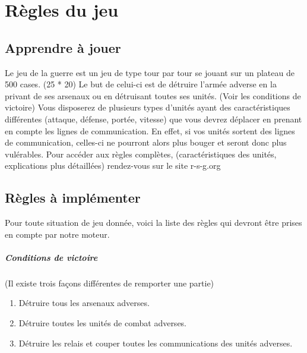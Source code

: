 \chapter{Règles du jeu}

		\section{Apprendre à jouer}
		
		Le jeu de la guerre est un jeu de type tour par tour se jouant sur un plateau de 500 cases. (25 * 20)
		Le but de celui-ci est de détruire l'armée adverse en la privant de ses arsenaux ou en détruisant toutes ses unités. (Voir les conditions de victoire)
		Vous disposerez de plusieurs types d'unités ayant des caractéristiques différentes (attaque, défense, portée, vitesse) que vous devrez déplacer 
		en prenant en compte les lignes de communication.
		En effet, si vos unités sortent des lignes de communication, celles-ci ne pourront alors plus bouger et seront donc plus vulérables.
		Pour accéder aux règles complètes, (caractéristiques des unités, explications plus détaillées) rendez-vous sur le site r-s-g.org~\cite{ref1}
		
		\section{Règles à implémenter}
		Pour toute situation de jeu donnée, voici la liste des règles qui devront être prises en compte par notre moteur.

		\paragraph{Conditions de victoire}
                 (Il existe trois façons différentes de remporter une partie)
		\begin{enumerate}
		\item Détruire tous les arsenaux adverses.
		\item Détruire toutes les unités de combat adverses.
		\item Détruire les relais et couper toutes les communications des unités adverses.
		\end{enumerate}
		
